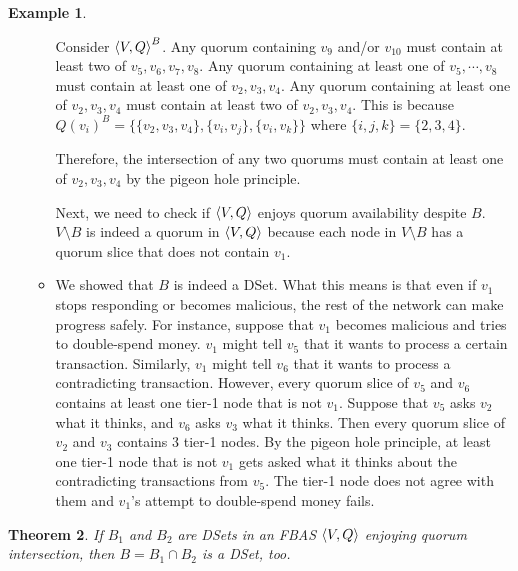 \documentclass[12pt, psamsfonts]{amsart}
\newtheorem{thm}{Theorem}[section]
\theoremstyle{definition}
\newtheorem{exmp}[thm]{Example}
\theoremstyle{remark}
\numberwithin{equation}{section}
\begin{document}
\begin{exmp}
\begin{itemize}
\begin{itemize}
                    Consider $\ev{V, Q}^B$.
                    Any quorum containing $v_9$ and/or $v_{10}$ must contain at least two of $v_5, v_6, v_7, v_8$.
                    Any quorum containing at least one of $v_5, \cdots, v_8$ must contain at least one of $v_2, v_3, v_4$.
                    Any quorum containing at least one of $v_2, v_3, v_4$ must contain at least two of $v_2, v_3, v_4$.
                    This is because $Q(v_i)^B = \{ \{ v_2, v_3, v_4 \}, \{ v_i, v_j \}, \{ v_i, v_k \} \}$ where $\{ i, j, k \} = \{ 2, 3, 4 \}$.

                    Therefore, the intersection of any two quorums must contain at least one of $v_2, v_3, v_4$ by the pigeon hole principle.

                    Next, we need to check if $\ev{V, Q}$ enjoys quorum availability despite $B$.
                    $V \setminus B$ is indeed a quorum in $\ev{V, Q}$ because each node in $V \setminus B$ has a quorum slice that does not contain $v_1$.
                \item
                    We showed that $B$ is indeed a DSet.
                    What this means is that even if $v_1$ stops responding or becomes malicious, the rest of the network can make progress safely.
                    For instance, suppose that $v_1$ becomes malicious and tries to double-spend money.
                    $v_1$ might tell $v_5$ that it wants to process a certain transaction.
                    Similarly, $v_1$ might tell $v_6$ that it wants to process a contradicting transaction.
                    However, every quorum slice of $v_5$ and $v_6$ contains at least one tier-1 node that is not $v_1$.
                    Suppose that $v_5$ asks $v_2$ what it thinks, and $v_6$ asks $v_3$ what it thinks.
                    Then every quorum slice of $v_2$ and $v_3$ contains 3 tier-1 nodes.
                    By the pigeon hole principle, at least one tier-1 node that is not $v_1$ gets asked what it thinks about the contradicting transactions from $v_5$.
                    The tier-1 node does not agree with them and $v_1$'s attempt to double-spend money fails.
            \end{itemize}
    \end{itemize}
\end{exmp}

\begin{thm}\label{intersection_dset}
    If $B_1$ and $B_2$ are DSets in an FBAS $\ev{V, Q}$ enjoying quorum intersection, then $B = B_1 \cap B_2$ is a DSet, too.
\end{thm}
\end{document}
